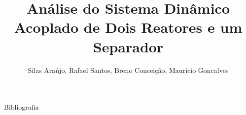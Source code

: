 \documentclass[aspectratio=169]{beamer}
\title{Análise do Sistema Dinâmico Acoplado de Dois Reatores e um Separador}
\author[Silas A., Rafael S., Breno C., Mauricio G.]{Silas Araújo, Rafael Santos, Breno Conceição, Mauricio Goncalves}
\institute{Escola Politécnica da Universidade Federal da Bahia}
\begin{document}
\maketitle








\begin{frame}[allowframebreaks]{Bibliografia}
  
\end{frame}
\end{document}
